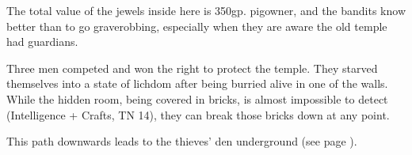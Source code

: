 \begin{multicols}{2}
The total value of the jewels inside here is 350gp.  \Gls{pigowner}, and the bandits know better than to go graverobbing, especially when they are aware the old temple had guardians.


Three men competed and won the right to protect the temple.  They starved themselves into a state of lichdom after being burried alive in one of the walls.  While the hidden room, being covered in bricks, is almost impossible to detect (Intelligence + Crafts, TN 14), they can break those bricks down at any point.

\demilich

This path downwards leads to the thieves' den underground (see page \pageref{pigexit}).

\end{multicols}

\subsection{}


\setcounter{list}{0}


